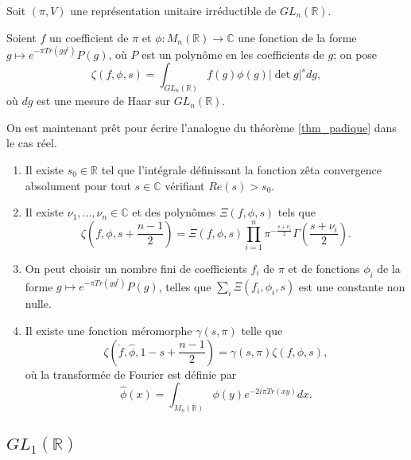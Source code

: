 Soit $(\pi, V)$ une représentation unitaire irréductible de $GL_n(\mathbb{R})$.
\begin{definition}
Soient $f$ un coefficient de $\pi$ et $\phi : M_n(\mathbb{R}) \rightarrow \mathbb{C}$ une fonction de la forme
$g \mapsto e^{-\pi Tr(gg^t)}P(g)$, où $P$ est un polynôme en les coefficients de $g$; on pose
\begin{equation}
\zeta(f, \phi, s) = \int_{GL_n(\mathbb{R})} f(g) \phi(g) |\det g|^s dg,
\end{equation}
où $dg$ est une mesure de Haar sur $GL_n(\mathbb{R})$.
\end{definition}

On est maintenant prêt pour écrire l'analogue du théorème \ref{thm_padique} dans le cas réel.
\begin{theoreme}
\label{thm_reel}
\begin{enumerate}
\item Il existe $s_0 \in \mathbb{R}$ tel que l'intégrale définissant la fonction zêta convergence absolument pour tout $s \in \mathbb{C}$ vérifiant $Re(s) > s_0$.
\item Il existe $\nu_1, ..., \nu_n \in \mathbb{C}$ et des polynômes $\Xi(f,\phi,s)$ tels que
\begin{equation}
\zeta(f, \phi, s+ \frac{n-1}{2}) = \Xi(f, \phi, s)\prod_{i=1}^n \pi^{-\frac{s+\nu_i}{2}}\Gamma(\frac{s+\nu_i}{2}).
\end{equation}
\item On peut choisir un nombre fini de coefficients $f_i$ de $\pi$ et de fonctions $\phi_i$ de la forme $g \mapsto e^{-\pi Tr(gg^t)}P(g)$, telles que $\sum_i \Xi(f_i, \phi_i, s)$ est une constante non nulle.
\item Il existe une fonction méromorphe $\gamma(s, \pi)$ telle que
\begin{equation}
\zeta(\check{f}, \hat{\phi}, 1-s+\frac{n-1}{2}) = \gamma(s, \pi)\zeta(f, \phi, s),
\end{equation}
où la transformée de Fourier est définie par
\begin{equation}
\hat{\phi}(x) = \int_{M_n(\mathbb{R})}\phi(y)e^{-2i\pi Tr(xy)}dx.
\end{equation}
\end{enumerate}
\end{theoreme}

\subsection{$GL_1(\mathbb{R})$}

